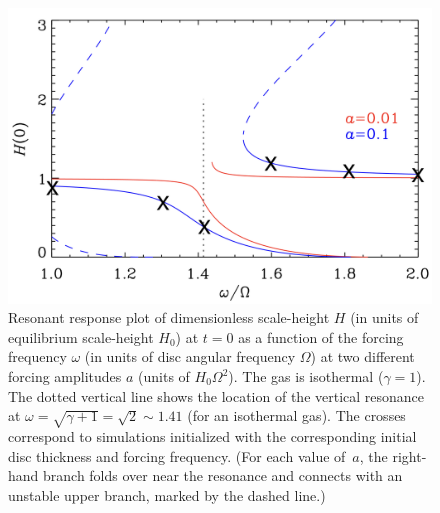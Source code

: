 \documentclass[fleqn,usenatbib]{mnras}
\begin{document}
\begin{figure}
\centering
\includegraphics[scale=0.24]{Figures/forced_amplitude_annotated_MonSep162024VersionPNG.png}
\caption{Resonant response plot of dimensionless scale-height $H$ (in units of equilibrium scale-height $H_0$) at $t = 0$ as a function of the forcing frequency $\omega$ (in units of disc angular frequency $\Omega$) at two different forcing amplitudes $a$ (units of $H_0 \Omega^2$). The gas is isothermal ($\gamma = 1$). The dotted vertical line shows the location of the vertical resonance at $\omega = \sqrt{\gamma+1} = \sqrt{2} \sim 1.41$ (for an isothermal gas). The crosses correspond to simulations initialized with the corresponding initial disc thickness and forcing frequency. (For each value of~$a$, the right-hand branch folds over near the resonance and connects with an unstable upper branch, marked by the dashed line.)}
\label{FIGURE_ForcedBounceInitialScaleheight}
\end{figure}
\end{document}
